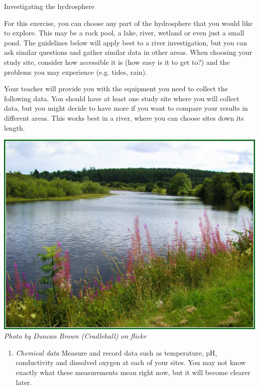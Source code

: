             \begin{Investigation}{Investigating the hydrosphere
      }
            \nopagebreak 
\begin{minipage}{.5\textwidth}
            \label{m38138*uid4}
For this exercise, you can choose any part of the hydrosphere that you would like to explore. This may be a rock pool, a lake, river, wetland or even just a small pond. The guidelines below will apply best to a river investigation, but you can ask similar questions and gather similar data in other areas. When choosing your study site, consider how accessible it is (how easy is it to get to?) and the problems you may experience (e.g. tides, rain).\par
\label{m38138*uid5}
Your teacher will provide you with the equipment you need to collect the following data. You should have at least one study site where you will collect data, but you might decide to have more if you want to compare your results in different areas. This works best in a river, where you can choose sites down its length. \par
\end{minipage}
\begin{minipage}{.5\textwidth}
\begin{center}
 \includegraphics[width=.8\textwidth]{photos/DuncanBrown(Cradlehall).jpg} \\
\textsl{Photo by Duncan Brown (Cradlehall) on flickr}
\end{center}
\end{minipage}
\label{m38138*id334646}\begin{enumerate}[noitemsep, label=\textbf{\arabic*}. ] 
            \label{m38138*uid6}\item \textsl{Chemical data}
Measure and record data such as temperature, pH, conductivity and dissolved oxygen at each of your sites. You may not know exactly what these measurements mean right now, but it will become clearer later.

\end{enumerate}
\end{Investigation}
